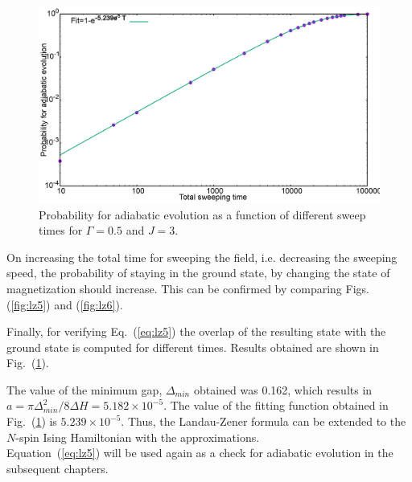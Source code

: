 \documentclass[../main.tex]{subfiles}
\begin{document}
\begin{figure}[H]
\centering 
\includegraphics[scale=0.24]{Probability_H100.png}
\caption{Probability for adiabatic evolution as a function of different sweep times for $\Gamma=0.5$ and $J=3$.}
\label{fig:lz7}
\end{figure}

On increasing the total time for sweeping the field, i.e. decreasing the sweeping speed, the probability of staying in the ground state, by changing the state of magnetization should increase. This can be confirmed by comparing Figs. (\ref{fig:lz5}) and (\ref{fig:lz6}).

Finally, for verifying Eq.~({\ref{eq:lz5}}) the overlap of the resulting state with the ground state is computed for different times. Results obtained are shown in Fig.~(\ref{fig:lz7}). 

The value of the minimum gap, $\Delta_{min}$ obtained was 0.162, which results in $a={\pi \Delta_{min}^2/8 \Delta H}= 5.182 \times 10^{-5}$. The value of the fitting function obtained in Fig.~(\ref{fig:lz7}) is $5.239 \times 10^{-5}$. Thus, the Landau-Zener formula can be extended to the $N$-spin Ising Hamiltonian with the approximations.\\

Equation~(\ref{eq:lz5}) will be used again as a check for adiabatic evolution in the subsequent chapters.
\end{document}
